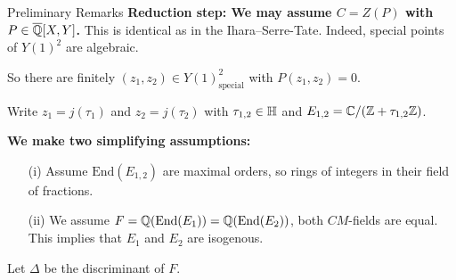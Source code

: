 \documentclass{beamer}
\begin{document}
\begin{frame}{Preliminary Remarks}
  \textbf{Reduction step: We may assume $C=Z(P)$ with $P\in{\overline{\mathbb{Q}}}[X,Y]$.} This
  is identical as in the Ihara--Serre-Tate. Indeed, special points of
  $Y(1)^2$ are algebraic.

  So there are finitely $(z_1,z_2) \in Y(1)^2_{\mathrm{special}}$ with
  $P(z_1,z_2)=0$.

  Write $z_1=j(\tau_1)$ and $z_2=j(\tau_2)$ with $\tau_{1,2}\in{\mathbb{H}}$
  and $E_{1,2} = {\mathbb{C}}/({\mathbb{Z}}+\tau_{1,2}{\mathbb{Z}})$.
  
  \textbf{We make two simplifying assumptions:}
  

  \begin{enumerate}
  \item [(i)] Assume $\mathrm{End}(E_{1,2})$ are \alert{maximal
      orders}, so rings of integers in their field of fractions.

  \item[(ii)] We assume $F = {\mathbb{Q}}(\mathrm{End}(E_1)) =
    {\mathbb{Q}}(\mathrm{End}(E_2))$, both $CM$-fields are equal. This implies
    that $E_1$ and $E_2$ are isogenous. 
  \end{enumerate}
  Let $\Delta$ be the
  discriminant of $F$. 
\end{frame}
\end{document}

